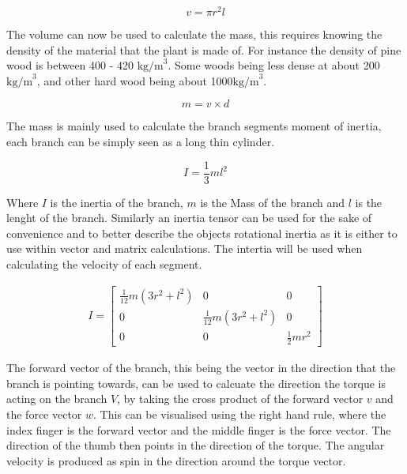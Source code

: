 \begin{equation}
v  = \pi r^2 l
\end{equation}

\noindent
The volume can now be used to calculate the mass, this requires knowing the density of the material that the plant is made of. For instance the density of pine wood is between 400 - 420 $\text{kg/m}^3$. Some woods being less dense at about 200 $\text{kg/m}^3$, and other hard wood being about 1000$\text{kg/m}^3$.

\begin{equation}
m = v \times d
\end{equation}

\noindent
The mass is mainly used to calculate the branch segments moment of inertia, each branch can be simply seen as a long thin cylinder.

\begin{equation}
I = \frac{1}{3} m l ^ 2
\end{equation}

\noindent
Where $I$ is the inertia of the branch, $m$ is the Mass of the branch and $l$ is the lenght of the branch. Similarly an inertia tensor can be used for the sake of convenience and to better describe the objects rotational inertia as it is either to use within vector and matrix calculations. The intertia will be used when calculating the velocity of each segment.

\begin{equation}
\begin{aligned}
I = \begin{bmatrix}
\frac{1}{12}m(3r^2 + l^2) 	& 0 							& 0 \\
0 							& \frac{1}{12}m(3r^2 + l^2)		& 0 \\
0 							& 0 							& \frac{1}{2}mr^2 
\end{bmatrix}
\end{aligned}
\end{equation}

\noindent
The forward vector of the branch, this being the vector in the direction that the branch is pointing towards, can be used to calcuate the direction the torque is acting on the branch $V$, by taking the cross product of the forward vector $v$ and the force vector $w$. This can be visualised using the right hand rule, where the index finger is the forward vector and the middle finger is the force vector. The direction of the thumb then points in the direction of the torque. The angular velocity is produced as spin in the direction around the torque vector.

